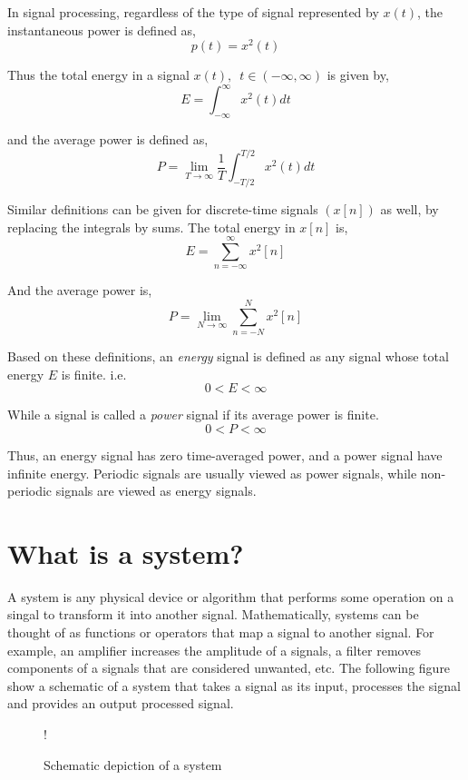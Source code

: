 In signal processing, regardless of the type of signal represented by $x\left(t\right)$, the instantaneous power is defined as,
\[ p\left(t\right) = x^{2}\left(t\right) \]

\noindent Thus the total energy in a signal $x\left(t\right), \,\,\, t \in (-\infty, \infty)$ is given by,
\[ E = \int_{-\infty}^{\infty} x^{2}\left(t\right) dt \]

\noindent and the average power is defined as,
\[ P = \lim_{T \to \infty} \frac{1}{T} \int_{-T/2}^{T/2} x^{2}\left(t\right) dt \]

Similar definitions can be given for discrete-time signals $\left(x\left[n\right]\right)$ as well, by replacing the integrals by sums. The total energy in $x\left[n\right]$ is,
\[ E = \sum_{n=-\infty}^{\infty} x^{2}\left[n\right] \]

\noindent And the average power is,
\[ P = \lim_{N \to \infty} \sum_{n=-N}^{N} x^{2}\left[n\right] \]

\noindent Based on these definitions, an \textit{energy} signal is defined as any signal whose total energy $E$ is finite. i.e.
\[ 0 < E < \infty \]

\noindent While a signal is called a \textit{power} signal if its average power is finite.
$$0 < P < \infty$$

Thus, an energy signal has zero time-averaged power, and a power signal have infinite energy. Periodic signals are usually viewed as power signals, while non-periodic signals are viewed as energy signals.

\section{What is a system?}
A system is any physical device or algorithm that performs some operation on a singal to transform it into another signal. Mathematically, systems can be thought of as functions or operators that map a signal to another signal. For example, an amplifier increases the amplitude of a signals, a filter removes components of a signals that are considered unwanted, etc. The following figure show a schematic of a system that takes a signal as its input, processes the signal and provides an output processed signal.

\begin{figure}[h]
    \centering
    \resizebox {\columnwidth} {!} {
    }
    \caption{Schematic depiction of a system} \label{fig:ch1_system}
\end{figure}

